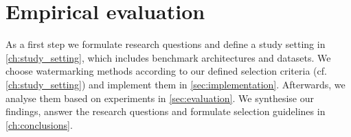 \section{Empirical evaluation}

As a first step we formulate research questions and define a study setting in \cref{ch:study_setting}, which includes benchmark architectures and datasets. We choose watermarking methods according to our defined selection criteria (cf. \cref{ch:study_setting}) and implement them in \cref{sec:implementation}. Afterwards, we analyse them based on experiments in \cref{sec:evaluation}. We synthesise our findings, answer the research questions and formulate selection guidelines in \cref{ch:conclusions}.


